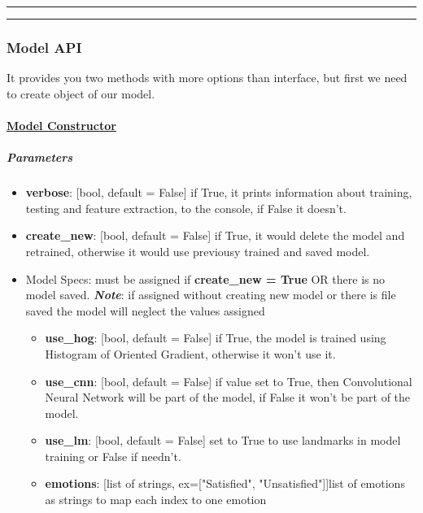 \hrule\vspace{0.5mm}\hrule
\subsubsection{Model API}
It provides you two methods with more options than interface, but first we need to create object of our model.
\bigbreak

\paragraph{\underline{Model Constructor}}

\subparagraph{Parameters}
\begin{changemargin}{0.5cm}{0cm}
\begin{itemize}
	\item \textbf{verbose}: [bool, default = False] if True, it prints information about training, testing and feature extraction, to the console, if False it doesn't.
	
	\item \textbf{create\_new}: [bool, default = False] if True, it would delete the model and retrained, otherwise it would use previousy trained and saved model.
	
	\item Model Specs: must be assigned if \textbf{create\_new = True} OR there is no model saved.
		\newline
		\textbf{\textit{Note}}: if assigned without creating new model or there is file saved the model will neglect the values assigned
		\begin{itemize}
			\item \textbf{use\_hog}: [bool, default = False] if True, the model is trained using  Histogram of Oriented Gradient, otherwise it won't use it.

			\item \textbf{use\_cnn}: [bool, default = False] if value set to True, then Convolutional Neural Network will be part of the model, if False it won't be part of the model.
			
			\item \textbf{use\_lm}: [bool, default = False] set to True to use landmarks in model training or False if needn't.
			
			\item \textbf{emotions}: [list of strings, ex=["Satisfied", "Unsatisfied"]]list of emotions as strings to map each index to one emotion 
		\end{itemize}
		
\end{itemize}
\end{changemargin}

